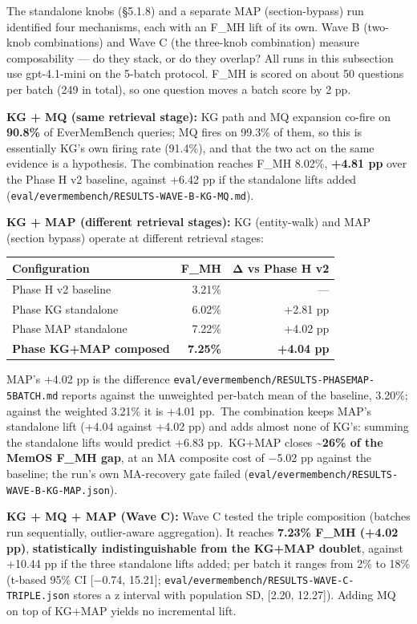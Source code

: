\documentclass[
]{article}
\newcounter{none} %
\begin{document}
The standalone knobs (§5.1.8) and a separate MAP (section-bypass) run
identified four mechanisms, each with an F\_MH lift of its own. Wave B
(two-knob combinations) and Wave C (the three-knob combination) measure
composability --- do they stack, or do they overlap? All runs in this
subsection use gpt-4.1-mini on the 5-batch protocol. F\_MH is scored on
about 50 questions per batch (249 in total), so one question moves a
batch score by 2 pp.

\textbf{KG + MQ (same retrieval stage):} KG path and MQ expansion
co-fire on \textbf{90.8\%} of EverMemBench queries; MQ fires on 99.3\%
of them, so this is essentially KG's own firing rate (91.4\%), and that
the two act on the same evidence is a hypothesis. The combination
reaches F\_MH 8.02\%, \textbf{+4.81 pp} over the Phase H v2 baseline,
against +6.42 pp if the standalone lifts added
(\texttt{eval/evermembench/RESULTS-WAVE-B-KG-MQ.md}).

\textbf{KG + MAP (different retrieval stages):} KG (entity-walk) and MAP
(section bypass) operate at different retrieval stages:

{\def\LTcaptype{none} %
\begin{longtable}[]{@{}lrr@{}}
\toprule\noalign{}
Configuration & F\_MH & Δ vs Phase H v2 \\
\midrule\noalign{}
\endhead
\bottomrule\noalign{}
\endlastfoot
Phase H v2 baseline & 3.21\% & --- \\
Phase KG standalone & 6.02\% & +2.81 pp \\
Phase MAP standalone & 7.22\% & +4.02 pp \\
\textbf{Phase KG+MAP composed} & \textbf{7.25\%} & \textbf{+4.04 pp} \\
\end{longtable}
}

MAP's +4.02 pp is the difference
\texttt{eval/evermembench/RESULTS-PHASEMAP-5BATCH.md} reports against
the unweighted per-batch mean of the baseline, 3.20\%; against the
weighted 3.21\% it is +4.01 pp.~The combination keeps MAP's standalone
lift (+4.04 against +4.02 pp) and adds almost none of KG's: summing the
standalone lifts would predict +6.83 pp.~KG+MAP closes
\textbf{\textasciitilde26\% of the MemOS F\_MH gap}, at an MA composite
cost of −5.02 pp against the baseline; the run's own MA-recovery gate
failed (\texttt{eval/evermembench/RESULTS-WAVE-B-KG-MAP.json}).

\textbf{KG + MQ + MAP (Wave C):} Wave C tested the triple composition
(batches run sequentially, outlier-aware aggregation). It reaches
\textbf{7.23\% F\_MH (+4.02 pp)}, \textbf{statistically
indistinguishable from the KG+MAP doublet}, against +10.44 pp if the
three standalone lifts added; per batch it ranges from 2\% to 18\%
(t-based 95\% CI {[}−0.74, 15.21{]};
\texttt{eval/evermembench/RESULTS-WAVE-C-TRIPLE.json} stores a z
interval with population SD, {[}2.20, 12.27{]}). Adding MQ on top of
KG+MAP yields no incremental lift.
\end{document}
